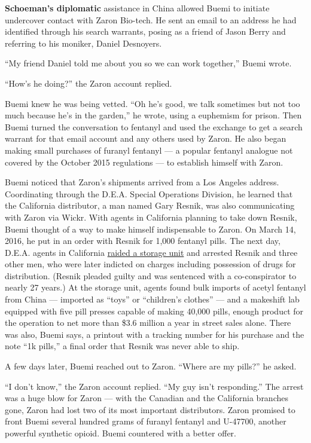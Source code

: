 \textbf{Schoeman's diplomatic} assistance in China allowed Buemi to
initiate undercover contact with Zaron Bio-tech. He sent an email to an
address he had identified through his search warrants, posing as a
friend of Jason Berry and referring to his moniker, Daniel Desnoyers.

``My friend Daniel told me about you so we can work together,'' Buemi
wrote.

``How's he doing?'' the Zaron account replied.

Buemi knew he was being vetted. ``Oh he's good, we talk sometimes but
not too much because he's in the garden,'' he wrote, using a euphemism
for prison. Then Buemi turned the conversation to fentanyl and used the
exchange to get a search warrant for that email account and any others
used by Zaron. He also began making small purchases of furanyl fentanyl
--- a popular fentanyl analogue not covered by the October 2015
regulations --- to establish himself with Zaron.

Buemi noticed that Zaron's shipments arrived from a Los Angeles address.
Coordinating through the D.E.A. Special Operations Division, he learned
that the California distributor, a man named Gary Resnik, was also
communicating with Zaron via Wickr. With agents in California planning
to take down Resnik, Buemi thought of a way to make himself
indispensable to Zaron. On March 14, 2016, he put in an order with
Resnik for 1,000 fentanyl pills. The next day, D.E.A. agents in
California
\href{https://www.justice.gov/usao-cdca/pr/long-beach-man-sentenced-over-26-years-prison-leading-counterfeit-opioid-scheme}{raided
a storage unit} and arrested Resnik and three other men, who were later
indicted on charges including possession of drugs for distribution.
(Resnik pleaded guilty and was sentenced with a co-conspirator to nearly
27 years.) At the storage unit, agents found bulk imports of acetyl
fentanyl from China --- imported as ``toys'' or ``children's clothes''
--- and a makeshift lab equipped with five pill presses capable of
making 40,000 pills, enough product for the operation to net more than
\$3.6 million a year in street sales alone. There was also, Buemi says,
a printout with a tracking number for his purchase and the note ``1k
pills,'' a final order that Resnik was never able to ship.

A few days later, Buemi reached out to Zaron. ``Where are my pills?'' he
asked.

``I don't know,'' the Zaron account replied. ``My guy isn't
responding.'' The arrest was a huge blow for Zaron --- with the Canadian
and the California branches gone, Zaron had lost two of its most
important distributors. Zaron promised to front Buemi several hundred
grams of furanyl fentanyl and U-47700, another powerful synthetic
opioid. Buemi countered with a better offer.

